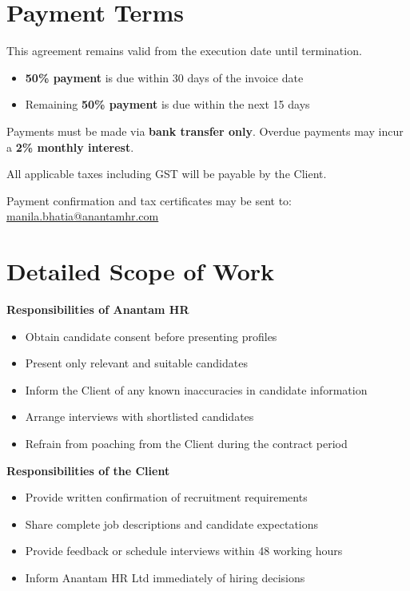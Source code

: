 \documentclass[12pt]{article}
\begin{document}
\section{Payment Terms}

This agreement remains valid from the execution date until termination.

\begin{itemize}
\item \textbf{50\% payment} is due within 30 days of the invoice date
\item Remaining \textbf{50\% payment} is due within the next 15 days
\end{itemize}

Payments must be made via \textbf{bank transfer only}. Overdue payments may incur a \textbf{2\% monthly interest}.

All applicable taxes including GST will be payable by the Client.

Payment confirmation and tax certificates may be sent to: \href{mailto:manila.bhatia@anantamhr.com}{manila.bhatia@anantamhr.com}

\section{Detailed Scope of Work}

\textbf{Responsibilities of Anantam HR}

\begin{itemize}
\item Obtain candidate consent before presenting profiles
\item Present only relevant and suitable candidates
\item Inform the Client of any known inaccuracies in candidate information
\item Arrange interviews with shortlisted candidates
\item Refrain from poaching from the Client during the contract period
\end{itemize}

\textbf{Responsibilities of the Client}

\begin{itemize}
\item Provide written confirmation of recruitment requirements
\item Share complete job descriptions and candidate expectations
\item Provide feedback or schedule interviews within 48 working hours
\item Inform Anantam HR Ltd immediately of hiring decisions
\end{itemize}
\end{document}
